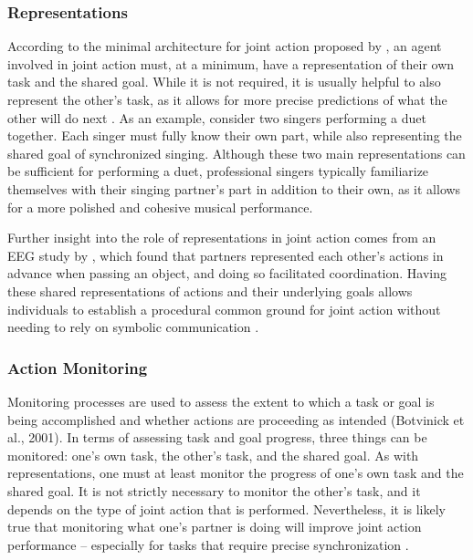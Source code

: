 \documentclass[10pt,a4paper,onecolumn]{article}
\begin{document}
\hypertarget{representations}{%
\subsubsection{Representations}\label{representations}}

According to the minimal architecture for joint action proposed by \textcite{vesperMinimalArchitectureJoint2010}, an agent involved in joint action must, at a minimum, have a representation of their own task and the shared goal. While it is not required, it is usually helpful to also represent the other's task, as it allows for more precise predictions of what the other will do next \autocite{boltSensoryAttenuationAuditory2021}. As an example, consider two singers performing a duet together. Each singer must fully know their own part, while also representing the shared goal of synchronized singing. Although these two main representations can be sufficient for performing a duet, professional singers typically familiarize themselves with their singing partner's part in addition to their own, as it allows for a more polished and cohesive musical performance.

Further insight into the role of representations in joint action comes from an EEG study by \textcite{kourtisPredictiveRepresentationOther2012}, which found that partners represented each other's actions in advance when passing an object, and doing so facilitated coordination. Having these shared representations of actions and their underlying goals allows individuals to establish a procedural common ground for joint action without needing to rely on symbolic communication \autocite{sebanzJointActionBodies2006}.

\hypertarget{action-monitoring}{%
\subsubsection{Action Monitoring}\label{action-monitoring}}

Monitoring processes are used to assess the extent to which a task or goal is being accomplished and whether actions are proceeding as intended (Botvinick et al., 2001). In terms of assessing task and goal progress, three things can be monitored: one's own task, the other's task, and the shared goal. As with representations, one must at least monitor the progress of one's own task and the shared goal. It is not strictly necessary to monitor the other's task, and it depends on the type of joint action that is performed. Nevertheless, it is likely true that monitoring what one's partner is doing will improve joint action performance -- especially for tasks that require precise synchronization \autocite{vesperMinimalArchitectureJoint2010}.
\end{document}
